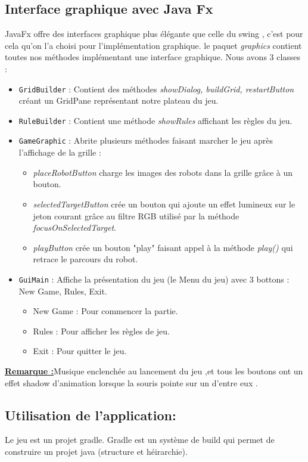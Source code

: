 \documentclass[12pt, a4paper, openany]{article}
\newcommand{\classname}[1]{\texttt{#1}}
\newcommand{\methodename}[1]{\textit{#1}}
\begin{document}
\subsection{Interface graphique avec Java Fx}
JavaFx offre des interfaces graphique plus élégante que celle du swing , c'est pour cela qu'on l'a choisi pour l’implémentation graphique.
le paquet \textit{graphics} contient toutes nos méthodes implémentant une interface graphique. Nous avons 3 classes : 
\begin{itemize}
\item \classname{GridBuilder} : Contient des méthodes \methodename{showDialog, buildGrid, restartButton} créant un GridPane représentant notre plateau du jeu.
\item \classname{RuleBuilder} : Contient une méthode \methodename{showRules} affichant les règles du jeu. 
\item \classname{GameGraphic} : Abrite plusieurs méthodes faisant marcher le jeu après l'affichage de la grille :
	\begin{itemize}
	\item[\textbullet] \methodename{placeRobotButton} charge les images des robots dans la grille grâce à un bouton. 
	\item[\textbullet] \methodename{selectedTargetButton} crée un bouton qui ajoute un effet lumineux sur le jeton courant grâce au filtre RGB utilisé par la méthode \methodename{focusOnSelectedTarget}.
	\item[\textbullet] \methodename{playButton} crée un bouton "play"  faisant appel à la méthode \methodename{play()} qui retrace le parcours du robot. 
	\end {itemize}
\item \classname{GuiMain} : Affiche la présentation du jeu (le Menu du jeu) avec 3 bottons : New Game, Rules, Exit.
	\begin{itemize}
	\item[\textbullet] New Game : Pour commencer la partie.
	\item[\textbullet] Rules : Pour afficher les règles de jeu. 
	\item[\textbullet] Exit : Pour quitter le jeu.
	\end {itemize}
\end{itemize}
\textbf{\underline{Remarque :}}Musique enclenchée au lancement du jeu ,et tous les boutons ont un effet shadow d'animation  lorsque la souris pointe sur un d'entre eux .

\subsection{Utilisation de l'application:}
Le jeu est un projet gradle. Gradle est un système de build qui permet de construire un projet java (structure et héirarchie).
\end{document}
